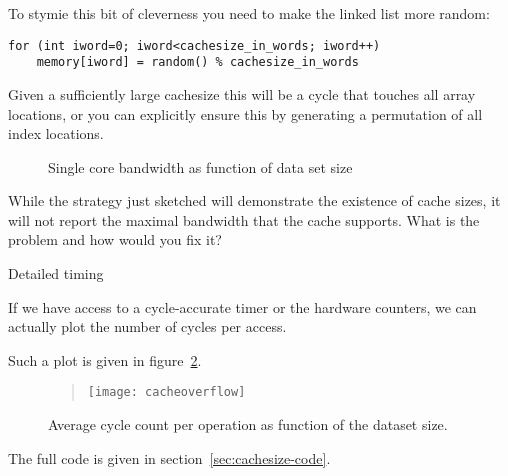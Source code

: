 To stymie this bit of cleverness you need to make the linked list more random:
\begin{lstlisting}
for (int iword=0; iword<cachesize_in_words; iword++)
    memory[iword] = random() % cachesize_in_words
\end{lstlisting}
Given a sufficiently large cachesize this will be a cycle
that touches all array locations,
or you can explicitly ensure this by generating a permutation of all index locations.

\begin{figure}[t]
  \pgfplotsset{table/col sep=comma}
  \caption{Single core bandwidth as function of data set size}
  \label{fig:core-bandwidth}
\end{figure}


\begin{exercise}
  While the strategy just sketched will demonstrate the existence of cache sizes,
  it will not report the maximal bandwidth that the cache supports.
  What is the problem and how would you fix it?
\end{exercise}

 {Detailed timing}

If we have access to a cycle-accurate timer or the hardware counters,
we can actually plot the number of cycles per access.

Such a plot is given in figure~\ref{fig:cache-overflow}.
\begin{figure}[ht]
  \begin{quote}
  \texttt{[image: cacheoverflow]}
  \end{quote}
  \caption{Average cycle count per operation as function of the dataset size.}
  \label{fig:cache-overflow}
\end{figure}
The full code is given in section~\ref{sec:cachesize-code}.

